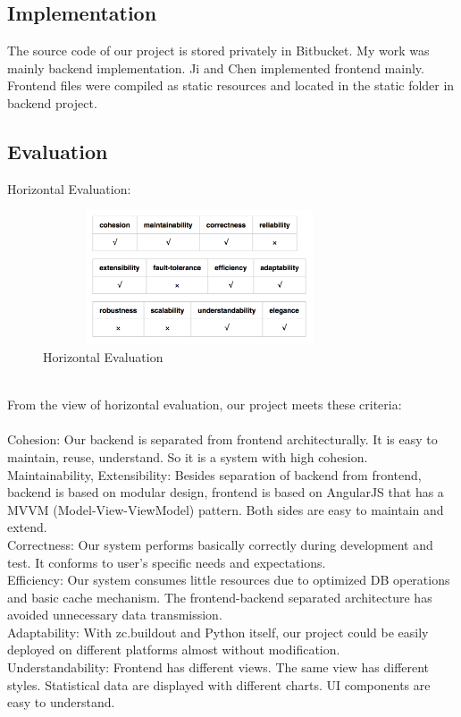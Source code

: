 \documentclass[12pt,oneside,a4paper]{article}
\begin{document}
\subsection{\large Implementation}
The source code of our project is stored privately in Bitbucket. My work was mainly backend implementation. Ji and Chen implemented frontend mainly. Frontend files were compiled as static resources and located in the static folder in backend project.
\subsection{\large Evaluation}
Horizontal Evaluation:
\begin{figure}[htb]
\centering
\includegraphics[width=350px, height=150px]{evaluation1.png}
\caption{Horizontal Evaluation}
\label{picture-label18}
\end{figure}\\
From the view of horizontal evaluation, our project meets these criteria:\\\\
Cohesion: Our backend is separated from frontend architecturally. It is easy to maintain, reuse, understand. So it is a system with high cohesion.\\
Maintainability, Extensibility: Besides separation of backend from frontend, backend is based on modular design, frontend is based on AngularJS that has a MVVM (Model-View-ViewModel) pattern. Both sides are easy to maintain and extend.\\
Correctness: Our system performs basically correctly during development and test. It conforms to user’s specific needs and expectations.\\
Efficiency: Our system consumes little resources due to optimized DB operations and basic cache mechanism. The frontend-backend separated architecture has avoided unnecessary data transmission.\\
Adaptability: With zc.buildout and Python itself, our project could be easily deployed on different platforms almost without modification.\\
Understandability: Frontend has different views. The same view has different styles. Statistical data are displayed with different charts. UI components are easy to understand.\\\\
\end{document}
